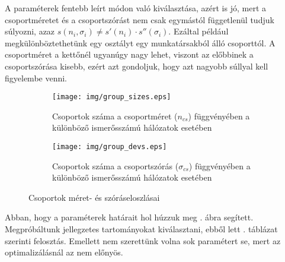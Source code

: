 \documentclass[12pt]{article}
\begin{document}
A paraméterek fentebb leírt módon való kiválasztása, azért is jó, mert a csoportméretet és a csoportszórást nem csak egymástól függetlenül tudjuk súlyozni, azaz $s(n_i, \sigma_i) \neq s'(n_i)\cdot s''(\sigma_i)$. Ezáltal például megkülönböztethetünk egy osztályt egy munkatársakból álló csoporttól. A csoportméret a kettőnél ugyanúgy nagy lehet, viszont az előbbinek a csoportszórása kisebb, ezért azt gondoljuk, hogy azt nagyobb súllyal kell figyelembe venni.
\begin{figure}[H]
	\centering
	\begin{subfigure}{0.49\textwidth}
		\texttt{[image: img/group\_sizes.eps]}
		\caption{Csoportok száma a csoportméret ($n_{cs}$) függvényében a különböző ismerősszámú hálózatok esetében}
	\end{subfigure} \hfill
	\begin{subfigure}{0.49\textwidth}
		\texttt{[image: img/group\_devs.eps]}
		\caption{Csoportok száma a csoportszórás ($\sigma_{cs}$) függvényében a különböző ismerősszámú hálózatok esetében}
	\end{subfigure}
	\caption{Csoportok méret- és szóráseloszlásai}
	\label{meret_szoras_eloszlas}
\end{figure}
Abban, hogy a paraméterek határait hol húzzuk meg . ábra segített. Megpróbáltunk jellegzetes tartományokat kiválasztani, ebből lett . táblázat szerinti felosztás. Emellett nem szerettünk volna sok paramétert se, mert az optimalizálásnál az nem előnyös. 
\end{document}
